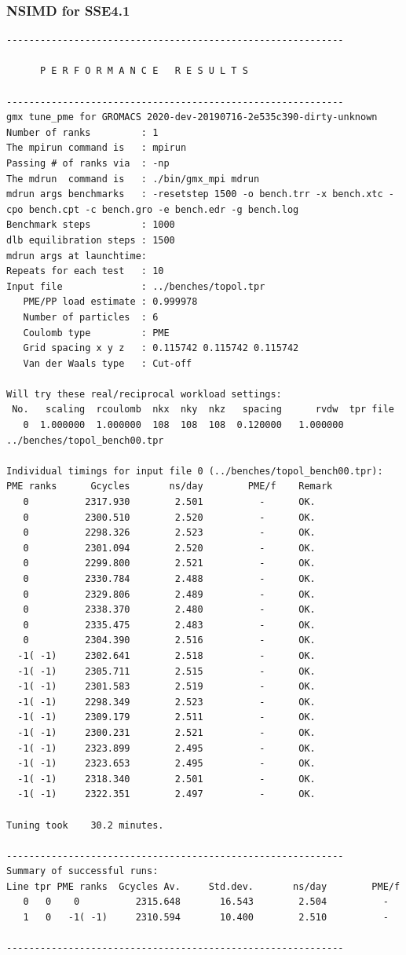 \subsubsection{NSIMD for SSE4.1}
\begin{lstlisting}[frame=single]
------------------------------------------------------------

      P E R F O R M A N C E   R E S U L T S

------------------------------------------------------------
gmx tune_pme for GROMACS 2020-dev-20190716-2e535c390-dirty-unknown
Number of ranks         : 1
The mpirun command is   : mpirun
Passing # of ranks via  : -np
The mdrun  command is   : ./bin/gmx_mpi mdrun
mdrun args benchmarks   : -resetstep 1500 -o bench.trr -x bench.xtc -cpo bench.cpt -c bench.gro -e bench.edr -g bench.log 
Benchmark steps         : 1000
dlb equilibration steps : 1500
mdrun args at launchtime: 
Repeats for each test   : 10
Input file              : ../benches/topol.tpr
   PME/PP load estimate : 0.999978
   Number of particles  : 6
   Coulomb type         : PME
   Grid spacing x y z   : 0.115742 0.115742 0.115742
   Van der Waals type   : Cut-off

Will try these real/reciprocal workload settings:
 No.   scaling  rcoulomb  nkx  nky  nkz   spacing      rvdw  tpr file
   0  1.000000  1.000000  108  108  108  0.120000   1.000000  ../benches/topol_bench00.tpr

Individual timings for input file 0 (../benches/topol_bench00.tpr):
PME ranks      Gcycles       ns/day        PME/f    Remark
   0          2317.930        2.501          -      OK.
   0          2300.510        2.520          -      OK.
   0          2298.326        2.523          -      OK.
   0          2301.094        2.520          -      OK.
   0          2299.800        2.521          -      OK.
   0          2330.784        2.488          -      OK.
   0          2329.806        2.489          -      OK.
   0          2338.370        2.480          -      OK.
   0          2335.475        2.483          -      OK.
   0          2304.390        2.516          -      OK.
  -1( -1)     2302.641        2.518          -      OK.
  -1( -1)     2305.711        2.515          -      OK.
  -1( -1)     2301.583        2.519          -      OK.
  -1( -1)     2298.349        2.523          -      OK.
  -1( -1)     2309.179        2.511          -      OK.
  -1( -1)     2300.231        2.521          -      OK.
  -1( -1)     2323.899        2.495          -      OK.
  -1( -1)     2323.653        2.495          -      OK.
  -1( -1)     2318.340        2.501          -      OK.
  -1( -1)     2322.351        2.497          -      OK.

Tuning took    30.2 minutes.

------------------------------------------------------------
Summary of successful runs:
Line tpr PME ranks  Gcycles Av.     Std.dev.       ns/day        PME/f
   0   0    0          2315.648       16.543        2.504          -  
   1   0   -1( -1)     2310.594       10.400        2.510          -  

------------------------------------------------------------

\end{lstlisting}

